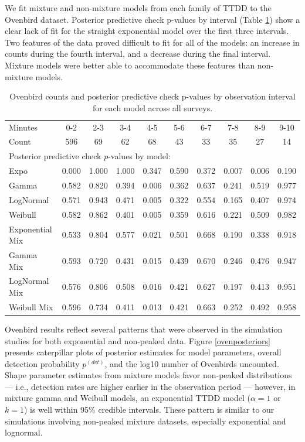 \documentclass[useAMS,usenatbib,referee,12pt]{article}
\begin{document}
We fit mixture and non-mixture models from each family of TTDD to the Ovenbird dataset.  Posterior predictive check p-values by interval (Table \ref{tbl:ovencounts}) show a clear lack of fit for the straight exponential model over the first three intervals.  Two features of the data proved difficult to fit for all of the models: an increase in counts during the fourth interval, and a decrease during the final interval.  Mixture models were better able to accommodate these features than non-mixture models.

\begin{table}[ht]
\centering
\begin{tabular}{lccccccccc}
  \hline
Minutes & 0-2 & 2-3 & 3-4 & 4-5 & 5-6 & 6-7 & 7-8 & 8-9 & 9-10 \\ 
Count & 596 & 69 & 62 & 68 & 43 & 33 & 35 & 27 & 14 \\ 
\hline
\multicolumn{10}{l}{Posterior predictive check $p$-values by model:}\\
\hline
Expo & 0.000 & 1.000 & 1.000 & 0.347 & 0.590 & 0.372 & 0.007 & 0.006 & 0.190 \\ 
  Gamma & 0.582 & 0.820 & 0.394 & 0.006 & 0.362 & 0.637 & 0.241 & 0.519 & 0.977 \\ 
  LogNormal & 0.571 & 0.943 & 0.471 & 0.005 & 0.322 & 0.554 & 0.165 & 0.407 & 0.974 \\ 
  Weibull & 0.582 & 0.862 & 0.401 & 0.005 & 0.359 & 0.616 & 0.221 & 0.509 & 0.982 \\ 
  Exponential Mix & 0.533 & 0.804 & 0.577 & 0.021 & 0.501 & 0.668 & 0.190 & 0.338 & 0.918 \\ 
  Gamma Mix & 0.593 & 0.720 & 0.431 & 0.015 & 0.439 & 0.670 & 0.246 & 0.476 & 0.947 \\ 
  LogNormal Mix & 0.576 & 0.806 & 0.508 & 0.016 & 0.421 & 0.627 & 0.197 & 0.413 & 0.951 \\ 
  Weibull Mix & 0.596 & 0.734 & 0.411 & 0.013 & 0.421 & 0.663 & 0.252 & 0.492 & 0.958 \\ 
   \hline
\end{tabular}
\caption{\label{tbl:ovencounts} Ovenbird counts and posterior predictive check p-values by observation interval for each model across all surveys.}
\end{table}

Ovenbird results reflect several patterns that were observed in the simulation studies for both exponential and non-peaked data.  Figure \ref{ovenposteriors} presents caterpillar plots of posterior estimates for model parameters, overall detection probability $p^{(det)}$, and the log10 number of Ovenbirds uncounted.  Shape parameter estimates from mixture models favor non-peaked distributions --- i.e., detection rates are higher earlier in the observation period --- however, in mixture gamma and Weibull models, an exponential TTDD model ($\alpha=1$ or $k=1$) is well within 95\% credible intervals.  These pattern is similar to our simulations involving non-peaked mixture datasets, especially exponential and lognormal.
\end{document}
